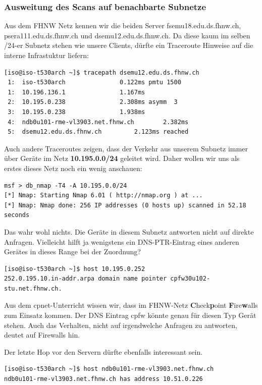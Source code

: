 \documentclass[a4paper,11pt]{scrartcl}
\begin{document}
\subsubsection{Ausweitung des Scans auf benachbarte Subnetze}
Aus dem FHNW Netz kennen wir die beiden Server fsemu18.edu.ds.fhnw.ch, psera111.edu.ds.fhnw.ch und dsemu12.edu.ds.fhnw.ch. Da diese kaum im selben /24-er Subnetz stehen wie unsere Clients, dürfte ein Traceroute Hinweise auf die interne Infrastuktur liefern:
\begin{lstlisting}
[iso@iso-t530arch ~]$ tracepath dsemu12.edu.ds.fhnw.ch
 1:  iso-t530arch				0.122ms pmtu 1500
 1:  10.196.136.1				1.167ms
 2:  10.195.0.238				2.308ms asymm  3 
 3:  10.195.0.238 				1.938ms 
 4:  ndb0u101-rme-vl3903.net.fhnw.ch		2.382ms 
 5:  dsemu12.edu.ds.fhnw.ch			2.123ms reached
\end{lstlisting}
Auch andere Traceroutes zeigen, dass der Verkehr aus unserem Subnetz immer über Geräte im Netz \textbf{10.195.0.0/24} geleitet wird. Daher wollen wir uns als erstes dieses Netz noch ein wenig anschauen:
\begin{lstlisting}
msf > db_nmap -T4 -A 10.195.0.0/24
[*] Nmap: Starting Nmap 6.01 ( http://nmap.org ) at ...
[*] Nmap: Nmap done: 256 IP addresses (0 hosts up) scanned in 52.18 seconds
\end{lstlisting}
Das wahr wohl nichts. Die Geräte in diesem Subnetz antworten nicht auf direkte Anfragen. Vielleicht hilft ja wenigstens ein DNS-PTR-Eintrag eines anderen Gerätes in dieses Range bei der Zuordnung?
\begin{lstlisting}
[iso@iso-t530arch ~]$ host 10.195.0.252
252.0.195.10.in-addr.arpa domain name pointer cpfw30u102-stu.net.fhnw.ch.
\end{lstlisting}
Aus dem cpnet-Unterricht wissen wir, dass im FHNW-Netz \textbf{C}heck\textbf{p}oint \textbf{F}ire\textbf{w}alls zum Einsatz kommen. Der DNS Eintrag cpfw könnte genau für diesen Typ Gerät stehen. Auch das Verhalten, nicht auf irgendwelche Anfragen zu antworten, deutet auf Firewalls hin.

Der letzte Hop vor den Servern dürfte ebenfalls interessant sein.
\begin{lstlisting}
[iso@iso-t530arch ~]$ host ndb0u101-rme-vl3903.net.fhnw.ch
ndb0u101-rme-vl3903.net.fhnw.ch has address 10.51.0.226
\end{lstlisting}
\end{document}
